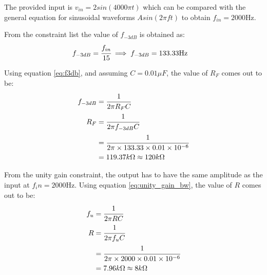 \documentclass[12pt, titlepage]{article}
\theoremstyle{definition}
\begin{document}
    The provided input is $v_{in} = 2 sin(4000\pi t)$ which can be compared with the general equation for sinusoidal waveforms $A sin(2\pi ft)$ to obtain \underline{$f_{in} = 2000\text{Hz}$}.

    From the constraint list the value of \underline{$f_{-3dB}$} is obtained as:
    \begin{align*}
      f_{-3dB} &= \cfrac{f_{in}}{15}
      \implies f_{-3dB} = 133.33\text{Hz}
    \end{align*}

    Using equation \ref{eq:f3db}, and assuming \underline{$C = 0.01\mu F$}, the value of \underline{$R_F$} comes out to be:
    \begin{align*}
      f_{-3dB} &= \cfrac{1}{2\pi R_FC} \\
      R_F &= \cfrac{1}{2\pi f_{-3dB}C} \\
      &= \cfrac{1}{2\pi \times 133.33 \times 0.01 \times 10^{-6}} \\
      &= 119.37k\Omega \approx 120k\Omega
    \end{align*}

    From the unity gain constraint, the output has to have the same amplitude as the input at $f_in = 2000\text{Hz}$.
    Using equation \ref{eq:unity_gain_bw}, the value of \underline{$R$} comes out to be:
    \begin{align*}
      f_u &= \cfrac{1}{2\pi RC} \\
      R &= \cfrac{1}{2\pi f_uC}\\
      &= \cfrac{1}{2\pi \times 2000 \times 0.01 \times 10^{-6}} \\
      &= 7.96k\Omega \approx 8k\Omega
    \end{align*}


  \newpage
\end{document}
